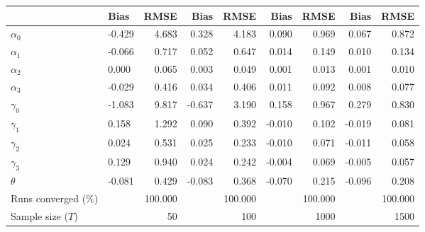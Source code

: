 
\begin{tabular}[t]{llrrrrrrr}
\toprule
  & Bias & RMSE & Bias & RMSE & Bias & RMSE & Bias & RMSE\\
\midrule
$\alpha_{0}$ & -0.429 & 4.683 & 0.328 & 4.183 & 0.090 & 0.969 & 0.067 & 0.872\\
$\alpha_{1}$ & -0.066 & 0.717 & 0.052 & 0.647 & 0.014 & 0.149 & 0.010 & 0.134\\
$\alpha_{2}$ & 0.000 & 0.065 & 0.003 & 0.049 & 0.001 & 0.013 & 0.001 & 0.010\\
$\alpha_{3}$ & -0.029 & 0.416 & 0.034 & 0.406 & 0.011 & 0.092 & 0.008 & 0.077\\
$\gamma_{0}$ & -1.083 & 9.817 & -0.637 & 3.190 & 0.158 & 0.967 & 0.279 & 0.830\\
$\gamma_{1}$ & 0.158 & 1.292 & 0.090 & 0.392 & -0.010 & 0.102 & -0.019 & 0.081\\
$\gamma_{2}$ & 0.024 & 0.531 & 0.025 & 0.233 & -0.010 & 0.071 & -0.011 & 0.058\\
$\gamma_{3}$ & 0.129 & 0.940 & 0.024 & 0.242 & -0.004 & 0.069 & -0.005 & 0.057\\
$\theta$ & -0.081 & 0.429 & -0.083 & 0.368 & -0.070 & 0.215 & -0.096 & 0.208\\
Runs converged (\%) &  & 100.000 &  & 100.000 &  & 100.000 &  & 100.000\\
Sample size ($T$) &  & 50 &  & 100 &  & 1000 &  & 1500\\
\bottomrule
\end{tabular}
